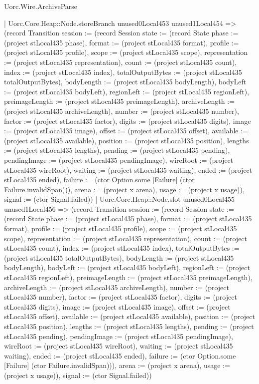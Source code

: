 \begin{lexlean}{Uorc.Wire.ArchiveParse}
\begin{semanticmodule}
{        | Uorc.Core.Heap::Node.storeBranch unused0Local453 unused1Local454 => (record Transition {session := (record Session {state := (record State {phase := (project stLocal435 phase), format := (project stLocal435 format), profile := (project stLocal435 profile), scope := (project stLocal435 scope), representation := (project stLocal435 representation), count := (project stLocal435 count), index := (project stLocal435 index), totalOutputBytes := (project stLocal435 totalOutputBytes), bodyLength := (project stLocal435 bodyLength), bodyLeft := (project stLocal435 bodyLeft), regionLeft := (project stLocal435 regionLeft), preimageLength := (project stLocal435 preimageLength), archiveLength := (project stLocal435 archiveLength), number := (project stLocal435 number), factor := (project stLocal435 factor), digits := (project stLocal435 digits), image := (project stLocal435 image), offset := (project stLocal435 offset), available := (project stLocal435 available), position := (project stLocal435 position), lengths := (project stLocal435 lengths), pending := (project stLocal435 pending), pendingImage := (project stLocal435 pendingImage), wireRoot := (project stLocal435 wireRoot), waiting := (project stLocal435 waiting), ended := (project stLocal435 ended), failure := (ctor Option.some [Failure] (ctor Failure.invalidSpan))}), arena := (project x arena), usage := (project x usage)}), signal := (ctor Signal.failed)})
        | Uorc.Core.Heap::Node.slot unused0Local455 unused1Local456 => (record Transition {session := (record Session {state := (record State {phase := (project stLocal435 phase), format := (project stLocal435 format), profile := (project stLocal435 profile), scope := (project stLocal435 scope), representation := (project stLocal435 representation), count := (project stLocal435 count), index := (project stLocal435 index), totalOutputBytes := (project stLocal435 totalOutputBytes), bodyLength := (project stLocal435 bodyLength), bodyLeft := (project stLocal435 bodyLeft), regionLeft := (project stLocal435 regionLeft), preimageLength := (project stLocal435 preimageLength), archiveLength := (project stLocal435 archiveLength), number := (project stLocal435 number), factor := (project stLocal435 factor), digits := (project stLocal435 digits), image := (project stLocal435 image), offset := (project stLocal435 offset), available := (project stLocal435 available), position := (project stLocal435 position), lengths := (project stLocal435 lengths), pending := (project stLocal435 pending), pendingImage := (project stLocal435 pendingImage), wireRoot := (project stLocal435 wireRoot), waiting := (project stLocal435 waiting), ended := (project stLocal435 ended), failure := (ctor Option.some [Failure] (ctor Failure.invalidSpan))}), arena := (project x arena), usage := (project x usage)}), signal := (ctor Signal.failed)})
}
\end{semanticmodule}
\end{lexlean}

